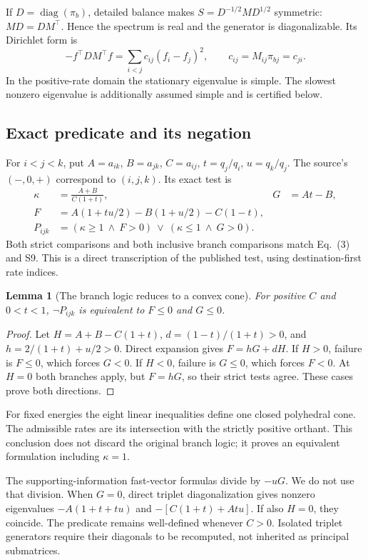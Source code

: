 \documentclass[11pt]{article}
\newtheorem{lemma}{Lemma}
\newcommand{\diag}{\operatorname{diag}}
\begin{document}
If $D=\diag(\pi_b)$, detailed balance makes $S=D^{-1/2}MD^{1/2}$ symmetric: $MD=DM^\top$. Hence the spectrum is real and the generator is diagonalizable. Its Dirichlet form is
\[
-f^\top D M^\top f=\sum_{i<j}c_{ij}(f_i-f_j)^2,\qquad c_{ij}=M_{ij}\pi_{bj}=c_{ji}.
\]
In the positive-rate domain the stationary eigenvalue is simple. The slowest nonzero eigenvalue is additionally assumed simple and is certified below.

\subsection{Exact predicate and its negation}
For $i<j<k$, put $A=a_{ik}$, $B=a_{jk}$, $C=a_{ij}$, $t=q_j/q_i$, $u=q_k/q_j$. The source's $(-,0,+)$ correspond to $(i,j,k)$. Its exact test is
\begin{align*}
\kappa&=\frac{A+B}{C(1+t)},&G&=At-B,\\
F&=A(1+tu/2)-B(1+u/2)-C(1-t),\\
P_{ijk}&=(\kappa\geq1\ \land\ F>0)\ \lor\ (\kappa\leq1\ \land\ G>0).
\end{align*}
Both strict comparisons and both inclusive branch comparisons match Eq.~(3) and S9. This is a direct transcription of the published test, using destination-first rate indices.

\begin{lemma}[The branch logic reduces to a convex cone]
For positive $C$ and $0<t<1$, $\neg P_{ijk}$ is equivalent to $F\leq0$ and $G\leq0$.
\end{lemma}
\begin{proof}
Let $H=A+B-C(1+t)$, $d=(1-t)/(1+t)>0$, and $h=2/(1+t)+u/2>0$. Direct expansion gives $F=hG+dH$. If $H>0$, failure is $F\leq0$, which forces $G<0$. If $H<0$, failure is $G\leq0$, which forces $F<0$. At $H=0$ both branches apply, but $F=hG$, so their strict tests agree. These cases prove both directions.
\end{proof}
For fixed energies the eight linear inequalities define one closed polyhedral cone. The admissible rates are its intersection with the strictly positive orthant. This conclusion does not discard the original branch logic; it proves an equivalent formulation including $\kappa=1$.

The supporting-information fast-vector formulas divide by $-uG$. We do not use that division. When $G=0$, direct triplet diagonalization gives nonzero eigenvalues $-A(1+t+tu)$ and $-[C(1+t)+Atu]$. If also $H=0$, they coincide. The predicate remains well-defined whenever $C>0$. Isolated triplet generators require their diagonals to be recomputed, not inherited as principal submatrices.
\end{document}
